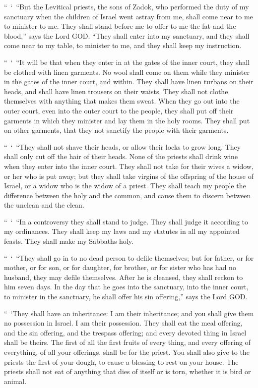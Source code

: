 \myverse{}“ ‘ “But the Levitical priests, the sons of Zadok, who performed
the duty of my sanctuary when the children of Israel went astray from me, shall come near to me to minister
to me. They shall stand before me to offer to me the fat and the blood,” says the Lord GOD.
\myverse{}“They shall enter into my sanctuary, and they shall come near to my table,
to minister to me, and they shall keep my instruction.

\myverse{}“ ‘ “It will be that when they enter in at the gates of the inner
court, they shall be clothed with linen garments. No wool shall come on them while they minister in the
gates of the inner court, and within.
\myverse{}They shall have linen turbans on their heads, and shall have linen trousers
on their waists. They shall not clothe themselves with anything that makes them sweat.
\myverse{}When they go out into the outer court, even into the outer court to the people,
they shall put off their garments in which they minister and lay them in the holy rooms. They shall put
on other garments, that they not sanctify the people with their garments.

\myverse{}“ ‘ “They shall not shave their heads, or allow their locks to
grow long. They shall only cut off the hair of their heads.
\myverse{}None of the priests shall drink wine when they enter into the inner court.
\myverse{}They shall not take for their wives a widow, or her who is put away; but
they shall take virgins of the offspring of the house of Israel, or a widow who is the widow of a priest.
\myverse{}They shall teach my people the difference between the holy and the common,
and cause them to discern between the unclean and the clean.

\myverse{}“ ‘ “In a controversy they shall stand to judge. They shall judge
it according to my ordinances. They shall keep my laws and my statutes in all my appointed feasts. They
shall make my Sabbaths holy.

\myverse{}“ ‘ “They shall go in to no dead person to defile themselves;
but for father, or for mother, or for son, or for daughter, for brother, or for sister who has had no
husband, they may defile themselves.
\myverse{}After he is cleansed, they shall reckon to him seven days.
\myverse{}In the day that he goes into the sanctuary, into the inner court, to minister
in the sanctuary, he shall offer his sin offering,” says the Lord GOD.

\myverse{}“ ‘They shall have an inheritance: I am their inheritance; and
you shall give them no possession in Israel. I am their possession.
\myverse{}They shall eat the meal offering, and the sin offering, and the trespass
offering; and every devoted thing in Israel shall be theirs.
\myverse{}The first of all the first fruits of every thing, and every offering of everything,
of all your offerings, shall be for the priest. You shall also give to the priests the first of your dough,
to cause a blessing to rest on your house.
\myverse{}The priests shall not eat of anything that dies of itself or is torn, whether
it is bird or animal.


